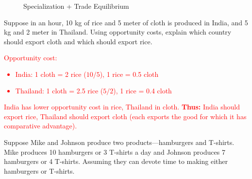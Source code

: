 \documentclass[11pt,letterpaper]{exam}
\begin{document}
\begin{questions}
\begin{parts}
\begin{figure}[htbp]
\begin{subfigure}{}
{
}

\end{subfigure}

\caption{Specialization + Trade Equilibrium}

\end{figure}

\end{parts}

\question Suppose in an hour, 10 kg of rice and 5 meter of cloth is produced in India, and 5 kg and 2 meter in Thailand. Using opportunity costs, explain which country should export cloth and which should export rice.

\textcolor{red}{
Opportunity cost:
\begin{itemize}
    \item India: 1 cloth = 2 rice ($10/5$), 1 rice = 0.5 cloth
    \item Thailand: 1 cloth = 2.5 rice ($5/2$), 1 rice = 0.4 cloth
\end{itemize}
India has lower opportunity cost in rice, Thailand in cloth.
\textbf{Thus:} India should export rice, Thailand should export cloth (each exports the good for which it has comparative advantage).
}

\question Suppose Mike and Johnson produce two products—hamburgers and T-shirts. Mike
produces 10 hamburgers or 3 T-shirts a day and Johnson produces 7 hamburgers or
4 T-shirts. Assuming they can devote time to making either hamburgers or T-shirts.
\end{questions}
\end{document}
